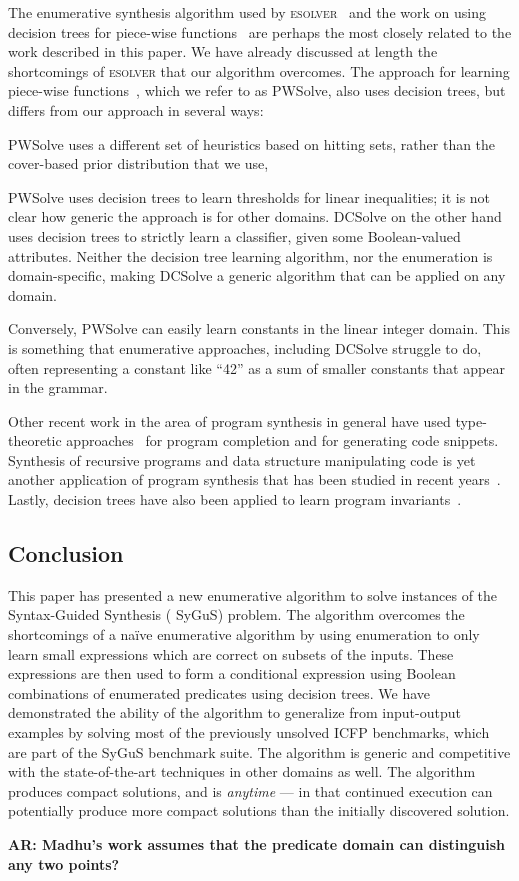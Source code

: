 \documentclass{llncs}
\newcommand\arsays[1]{{\bf AR: #1}}
\newcommand{\sygus}{{\sffamily\fontsize{8.5}{10}\selectfont
    SyGuS}\xspace}
\newcommand{\dcsolve}{{\sffamily\fontsize{8.5}{10}\selectfont
    DCSolve}\xspace}
\newcommand{\esolver}{\textsc{esolver}\xspace}
\newcommand{\pwsolve}{{\sffamily\fontsize{8.5}{10}\selectfont
    PWSolve}\xspace}
\begin{document}
The enumerative synthesis algorithm used by
\esolver~\cite{udupa-transit, udupa-sygus} and the work on using decision
trees for piece-wise functions~\cite{madhusudan-16-pw} are perhaps the
most closely related to the work described in this paper. We have
already discussed at length the shortcomings of \esolver that our
algorithm overcomes. The approach for learning piece-wise
functions~\cite{madhusudan-16-pw}, which we refer to as \pwsolve, also
uses decision trees, but differs from our approach in several ways:
\begin{inparaenum}[(a)]
\item
\pwsolve uses a different set of heuristics based on hitting sets,
rather than the cover-based prior distribution that we use,
\item
\pwsolve uses decision trees to learn thresholds for linear
inequalities; it is not clear how generic the approach is for other
domains. \dcsolve on the other hand uses decision trees to strictly
learn a classifier, given some Boolean-valued attributes. Neither the
decision tree learning algorithm, nor the enumeration is
domain-specific, making \dcsolve a generic algorithm that can be
applied on any domain.
\item
Conversely, \pwsolve can easily learn constants in the linear
integer domain. This is something that enumerative approaches,
including \dcsolve struggle to do, often representing a constant like
``42'' as a sum of smaller constants that appear in the grammar.
\end{inparaenum}

Other recent work in the area of program synthesis in general have
used type-theoretic approaches~\cite{gvero-13,osera-15,frankle-16} for
program completion and for generating code snippets. Synthesis of
recursive programs and data structure manipulating code is yet another
application of program synthesis that has been studied in recent
years~\cite{kuncak-10,kneuss-13,albarghouthi-13,feser-15}. Lastly,
decision trees have also been applied to learn program
invariants~\cite{garg-16}.

\subsection{Conclusion}
This paper has presented a new enumerative algorithm to solve
instances of the Syntax-Guided Synthesis (\sygus) problem. The
algorithm overcomes the shortcomings of a na\"ive enumerative
algorithm by using enumeration to only learn small expressions which
are correct on subsets of the inputs. These expressions are then used
to form a conditional expression using Boolean combinations of
enumerated predicates using decision trees. We have demonstrated the
ability of the algorithm to generalize from input-output examples by
solving most of the previously unsolved ICFP benchmarks, which are
part of the \sygus benchmark suite. The algorithm is generic and
competitive with the state-of-the-art techniques in other domains as
well. The algorithm produces compact solutions, and is \emph{anytime}
--- in that continued execution can potentially produce more compact
solutions than the initially discovered solution.



\setlength{\bibsep}{1pt}
\begin{small}

\end{small}

\arsays{Madhu's work assumes that the predicate domain can distinguish
any two points?}
\end{document}
